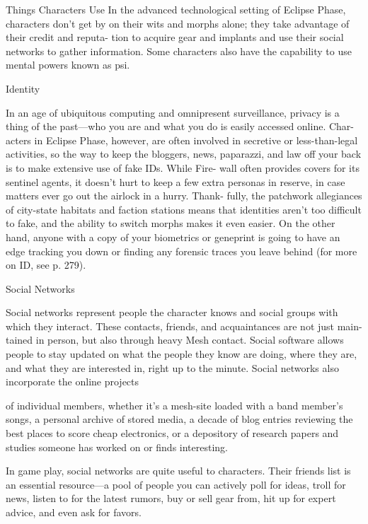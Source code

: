 Things Characters Use
In the advanced technological setting of Eclipse Phase,
characters don't get by on their wits and morphs
alone; they take advantage of their credit and reputa-
tion to acquire gear and implants and use their social
networks to gather information. Some characters also
have the capability to use mental powers known as psi.

Identity

In an age of ubiquitous computing and omnipresent
surveillance, privacy is a thing of the past—who you
are and what you do is easily accessed online. Char-
acters in Eclipse Phase, however, are often involved
in secretive or less-than-legal activities, so the way to
keep the bloggers, news, paparazzi, and law off your
back is to make extensive use of fake IDs. While Fire-
wall often provides covers for its sentinel agents, it
doesn't hurt to keep a few extra personas in reserve, in
case matters ever go out the airlock in a hurry. Thank-
fully, the patchwork allegiances of city-state habitats
and faction stations means that identities aren't too
difficult to fake, and the ability to switch morphs
makes it even easier. On the other hand, anyone with a
copy of your biometrics or geneprint is going to have
an edge tracking you down or finding any forensic
traces you leave behind (for more on ID, see p. 279).

Social Networks

Social networks represent people the character knows
and social groups with which they interact. These
contacts, friends, and acquaintances are not just main-
tained in person, but also through heavy Mesh contact.
Social software allows people to stay updated on what
the people they know are doing, where they are, and
what they are interested in, right up to the minute.
Social networks also incorporate the online projects


of individual members, whether it's a mesh-site loaded
with a band member's songs, a personal archive of
stored media, a decade of blog entries reviewing the
best places to score cheap electronics, or a depository
of research papers and studies someone has worked
on or finds interesting.

In game play, social networks are quite useful
to characters. Their friends list is an essential
resource—a pool of people you can actively poll for
ideas, troll for news, listen to for the latest rumors,
buy or sell gear from, hit up for expert advice, and
even ask for favors.

